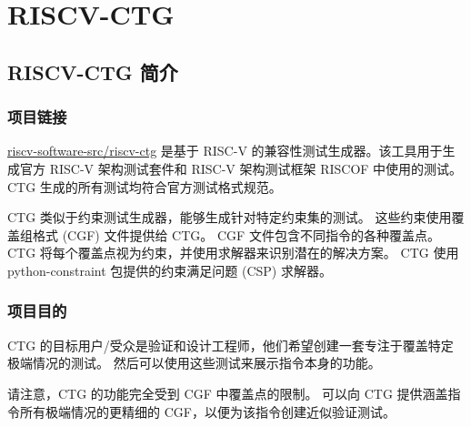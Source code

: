 \documentclass[xcolor=table,dvipsnames,svgnames,aspectratio=169]{ctexbeamer}
\begin{document}
\section{RISCV-CTG}

\subsection{RISCV-CTG 简介}

\begin{frame}
  \frametitle{项目链接}

  \href{https://github.com/riscv-software-src/riscv-ctg}{riscv-software-src/riscv-ctg} 是基于 RISC-V 的兼容性测试生成器。该工具用于生成官方 RISC-V 架构测试套件和 RISC-V 架构测试框架 RISCOF 中使用的测试。 CTG 生成的所有测试均符合官方测试格式规范。

  CTG 类似于约束测试生成器，能够生成针对特定约束集的测试。 这些约束使用覆盖组格式 (CGF) 文件提供给 CTG。 CGF 文件包含不同指令的各种覆盖点。 CTG 将每个覆盖点视为约束，并使用求解器来识别潜在的解决方案。 CTG 使用 python-constraint 包提供的约束满足问题 (CSP) 求解器。
\end{frame}

\begin{frame}%
  \frametitle{项目目的}
  CTG 的目标用户/受众是验证和设计工程师，他们希望创建一套专注于覆盖特定极端情况的测试。 然后可以使用这些测试来展示指令本身的功能。

  请注意，CTG 的功能完全受到 CGF 中覆盖点的限制。 可以向 CTG 提供涵盖指令所有极端情况的更精细的 CGF，以便为该指令创建近似验证测试。
\end{frame}
\end{document}
